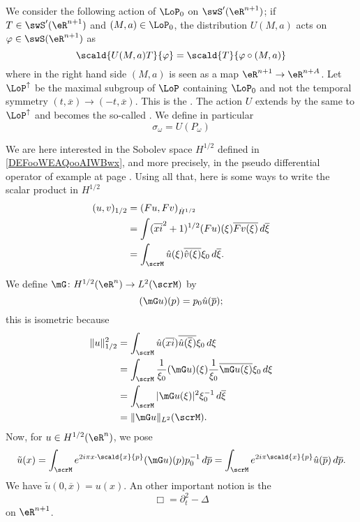We consider the following action of $\LoP_0$ on $\swS'(\eR^{n+1})$; if $T\in\swS'(\eR^{n+1})$ and $(M,a)\in\LoP_0$, the distribution $U(M,a)$ acts on $\varphi\in\swS(\eR^{n+1})$ as
\begin{equation}
	\scald{ U(M,a)T }{ \varphi }=\scald{ T }{ \varphi\circ(M,a) }
\end{equation}
where in the right hand side $(M,a)$ is seen as a map $\eR^{n+1}\to\eR^{n+A}$. Let $\LoP^{\uparrow}$ be the maximal subgroup of $\LoP$ containing $\LoP_0$ and not the temporal symmetry $(t,\overline{x})\to(-t,\overline{x})$. This is the . The action $U$ extends by the same to $\LoP^{\uparrow}$ and becomes the so-called . We define in particular
\begin{equation}
\sigma_{\omega}=U(P_{\omega})
\end{equation}

We are here interested in the Sobolev space $H^{1/2}$ defined in \ref{DEFooWEAQooAIWBwx}, and more precisely, in the pseudo differential operator of example at page \pageref{pg_exem_psdo}. Using all that, here is some ways to write the scalar product in $H^{1/2}$ 
\begin{equation}
\begin{split}
  (u,v)_{1/2}&=(Fu,Fv)_{\hat H^{1/2}}\\
		&=\int (\overline{xi}^2+1)^{1/2}(Fu)(\xi)\overline{ Fv(\xi) }\,d\overline{ \xi }\\
		&=\int_{\scrM}\hat u(\xi)\overline{ \hat v(\xi) }\xi_0\,d\overline{ \xi }.
\end{split}
\end{equation}

We define $\mG\colon H^{1/2}(\eR^n)\to L^2(\scrM)$ by
\begin{equation}
  (\mG u)(p)=p_0\hat u(\overline{p});
\end{equation}
this is isometric because
\[ 
\begin{split}
  \| u \|_{1/2}^2&=\int_{\scrM}\hat u(\overline{xi})\overline{ \hat u(\overline{ \xi }) }\xi_0\,d\xi\\
		&=\int_{\scrM}\frac{1}{ \xi_0 }(\mG u)(\xi)\frac{1}{ \xi_0 }\overline{ \mG u(\xi) }\xi_0\,d\xi\\
		&=\int_{\scrM}| \mG u(\xi) |^2\xi_0^{-1}\,d\overline{ \xi }\\
		&=\| \mG u \|_{L^2}(\scrM).
\end{split}  
\]
Now, for $u\in H^{1/2}(\eR^n)$, we pose
\begin{equation}
  \tilde u(x)=\int_{\scrM} e^{2i\pi x\cdot\scald{ x }{ p } }(\mG u)(p)p_0^{-1}\,d\overline{p}
		=\int_{\scrM} e^{2i\pi\scald{ x }{ p }}\hat u(\overline{p})\,d\overline{p}.
\end{equation}
We have $\tilde u(0,\overline{x})=u(x)$. An other important notion is the 
\[ 
  \Box=\partial_t^2-\Delta
\]
on $\eR^{n+1}$.


